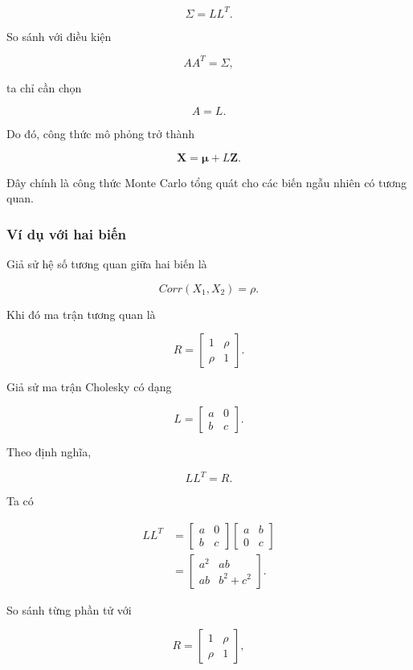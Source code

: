 \[
\boxed{
\Sigma
=
LL^T.
}
\]

So sánh với điều kiện

\[
AA^T=\Sigma,
\]

ta chỉ cần chọn

\[
\boxed{
A=L.
}
\]

Do đó, công thức mô phỏng trở thành

\[
\boxed{
\mathbf X
=
\boldsymbol{\mu}
+
L\mathbf Z.
}
\]

Đây chính là công thức Monte Carlo tổng quát cho các biến ngẫu nhiên có tương quan.

\subsubsection*{Ví dụ với hai biến}

Giả sử hệ số tương quan giữa hai biến là

\[
Corr(X_1,X_2)=\rho.
\]

Khi đó ma trận tương quan là

\[
R=
\begin{bmatrix}
1&\rho\\
\rho&1
\end{bmatrix}.
\]

Giả sử ma trận Cholesky có dạng

\[
L=
\begin{bmatrix}
a&0\\
b&c
\end{bmatrix}.
\]

Theo định nghĩa,

\[
LL^T=R.
\]

Ta có

\[
\begin{aligned}
LL^T
&=
\begin{bmatrix}
a&0\\
b&c
\end{bmatrix}
\begin{bmatrix}
a&b\\
0&c
\end{bmatrix}
\\
&=
\begin{bmatrix}
a^2&ab\\
ab&b^2+c^2
\end{bmatrix}.
\end{aligned}
\]

So sánh từng phần tử với

\[
R=
\begin{bmatrix}
1&\rho\\
\rho&1
\end{bmatrix},
\]

